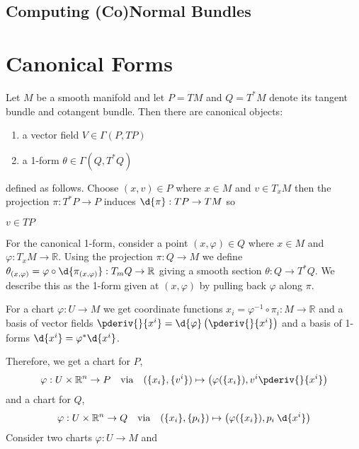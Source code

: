 \documentclass[12pt]{article}
\begin{document}
\subsection{Computing (Co)Normal Bundles}

\renewcommand{\R}{\mathbb{R}}

\section{Canonical Forms}

\begin{defn}
Let $M$ be a smooth manifold and let $P = TM$ and $Q = T^* M$ denote its tangent bundle and cotangent bundle. Then there are canonical objects:
\begin{enumerate}
\item a vector field $V \in \Gamma(P, TP)$
\item a 1-form $\theta \in \Gamma(Q, T^*Q)$
\end{enumerate}
defined as follows. Choose $(x, v) \in P$ where $x \in M$ and $v \in T_x M$ then the projection $\pi : T^*P \to P$ induces $\d{\pi}  : TP \to TM$ so 

$v \in TP$ 

For the canonical 1-form, consider a point $(x, \varphi) \in Q$ where $x \in M$ and $\varphi : T_x M \to \mathbb{R}$. Using the projection $\pi : Q \to M$ we define $\theta_{(x, \varphi)} = \varphi \circ \d{\pi_{(x, \varphi)}} : T_m Q \to \mathbb{R}$ giving a smooth section $\theta : Q \to T^* Q$. We describe this as the 1-form given at $(x, \varphi)$ by pulling back $\varphi$ along $\pi$.

\end{defn}

\begin{rmk}
For a chart $\varphi : U \to M$ we get coordinate functions $x_i = \varphi^{-1} \circ \pi_i : M \to \mathbb{R}$ and a basis of vector fields $\pderiv{}{x^i} = \d{\varphi} \left( \pderiv{}{x^i} \right)$ and a basis of 1-forms $\d{x^i} = \varphi^* \d{x^i}$. 
\end{rmk}

\begin{rmk}
Therefore, we get a chart for $P$,
\[ \varphi : U \times \R^n \to  P \quad \text{via} \quad ( \{ x_i \}, \{ v^i \} ) \mapsto \left( \varphi(\{ x_i \}), v^i \pderiv{}{x^i} \right) \] 
and a chart for $Q$,
\[ \varphi : U \times \R^n \to Q \quad \text{via} \quad ( \{ x_i \}, \{ p_i \} ) \mapsto \left( \varphi(\{ x_i \}), p_i \: \d{x^i} \right) \] 
Consider two charts $\varphi : U \to M$ and 
\end{rmk}
\end{document}
